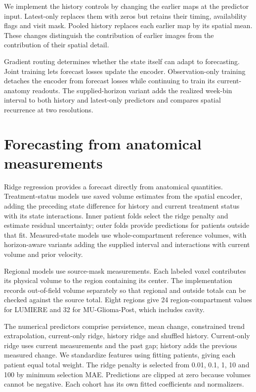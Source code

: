 We implement the history controls by changing the earlier maps at the predictor input. Latest-only replaces them with zeros but retains their timing, availability flags and visit mask. Pooled history replaces each earlier map by its spatial mean. These changes distinguish the contribution of earlier images from the contribution of their spatial detail.

Gradient routing determines whether the state itself can adapt to forecasting. Joint training lets forecast losses update the encoder. Observation-only training detaches the encoder from forecast losses while continuing to train its current-anatomy readouts. The supplied-horizon variant adds the realized week-bin interval to both history and latest-only predictors and compares spatial recurrence at two resolutions.

\section{Forecasting from anatomical measurements}

Ridge regression provides a forecast directly from anatomical quantities. Treatment-status models use saved volume estimates from the spatial encoder, adding the preceding state difference for history and current treatment status with its state interactions. Inner patient folds select the ridge penalty and estimate residual uncertainty; outer folds provide predictions for patients outside that fit. Measured-state models use whole-compartment reference volumes, with horizon-aware variants adding the supplied interval and interactions with current volume and prior velocity.

Regional models use source-mask measurements. Each labeled voxel contributes its physical volume to the region containing its center. The implementation records out-of-field volume separately so that regional and outside totals can be checked against the source total. Eight regions give 24 region-compartment values for LUMIERE and 32 for MU-Glioma-Post, which includes cavity.

The numerical predictors comprise persistence, mean change, constrained trend extrapolation, current-only ridge, history ridge and shuffled history. Current-only ridge uses current measurements and the past gap; history adds the previous measured change. We standardize features using fitting patients, giving each patient equal total weight. The ridge penalty is selected from 0.01, 0.1, 1, 10 and 100 by minimum selection MAE. Predictions are clipped at zero because volumes cannot be negative. Each cohort has its own fitted coefficients and normalizers.

